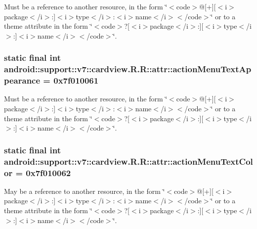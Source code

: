Must be a reference to another resource, in the form \char`\"{}$<$code$>$@\mbox{[}+\mbox{]}\mbox{[}$<$i$>$package$<$/i$>$:\mbox{]}$<$i$>$type$<$/i$>$:$<$i$>$name$<$/i$>$$<$/code$>$\char`\"{} or to a theme attribute in the form \char`\"{}$<$code$>$?\mbox{[}$<$i$>$package$<$/i$>$:\mbox{]}\mbox{[}$<$i$>$type$<$/i$>$:\mbox{]}$<$i$>$name$<$/i$>$$<$/code$>$\char`\"{}. \hypertarget{classandroid_1_1support_1_1v7_1_1cardview_1_1_r_1_1attr_17cd216064cf39940a1d53a8ecedd28a}{
\subsubsection[{actionMenuTextAppearance}]{\setlength{\rightskip}{0pt plus 5cm}static final int android::support::v7::cardview.R.R::attr::actionMenuTextAppearance = 0x7f010061}}
\label{classandroid_1_1support_1_1v7_1_1cardview_1_1_r_1_1attr_17cd216064cf39940a1d53a8ecedd28a}


Must be a reference to another resource, in the form \char`\"{}$<$code$>$@\mbox{[}+\mbox{]}\mbox{[}$<$i$>$package$<$/i$>$:\mbox{]}$<$i$>$type$<$/i$>$:$<$i$>$name$<$/i$>$$<$/code$>$\char`\"{} or to a theme attribute in the form \char`\"{}$<$code$>$?\mbox{[}$<$i$>$package$<$/i$>$:\mbox{]}\mbox{[}$<$i$>$type$<$/i$>$:\mbox{]}$<$i$>$name$<$/i$>$$<$/code$>$\char`\"{}. \hypertarget{classandroid_1_1support_1_1v7_1_1cardview_1_1_r_1_1attr_fdb73a0b9ebbb55e0c72216b5673db5f}{
\subsubsection[{actionMenuTextColor}]{\setlength{\rightskip}{0pt plus 5cm}static final int android::support::v7::cardview.R.R::attr::actionMenuTextColor = 0x7f010062}}
\label{classandroid_1_1support_1_1v7_1_1cardview_1_1_r_1_1attr_fdb73a0b9ebbb55e0c72216b5673db5f}


May be a reference to another resource, in the form \char`\"{}$<$code$>$@\mbox{[}+\mbox{]}\mbox{[}$<$i$>$package$<$/i$>$:\mbox{]}$<$i$>$type$<$/i$>$:$<$i$>$name$<$/i$>$$<$/code$>$\char`\"{} or to a theme attribute in the form \char`\"{}$<$code$>$?\mbox{[}$<$i$>$package$<$/i$>$:\mbox{]}\mbox{[}$<$i$>$type$<$/i$>$:\mbox{]}$<$i$>$name$<$/i$>$$<$/code$>$\char`\"{}. 

